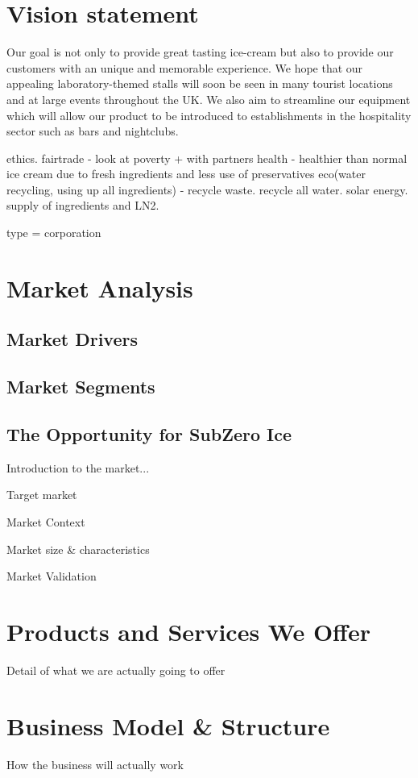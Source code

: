 \documentclass{article}
\begin{document}
\section{Vision statement}

Our goal is not only to provide great tasting ice-cream but also to provide our customers with an unique and memorable experience. We hope that our appealing laboratory-themed stalls will soon be seen in many tourist locations and at large events throughout the UK.
We also aim to streamline our equipment which will allow our product to be introduced to establishments in the hospitality sector such as bars and nightclubs.


ethics.
fairtrade - look at poverty + with partners
health - healthier than normal ice cream due to fresh ingredients and less use of preservatives
eco(water recycling, using up all ingredients) - recycle waste. recycle all water. solar energy. supply of ingredients and LN2.

type = corporation


\section{Market Analysis}
  \subsection{Market Drivers}
  \subsection{Market Segments}
  \subsection{The Opportunity for SubZero Ice}
  Introduction to the market...

  Target market

  Market Context

  Market size & characteristics

  Market Validation



\section{Products and Services We Offer}
  Detail of what we are actually going to offer

\section{Business Model & Structure}
  How the business will actually work
\end{document}
